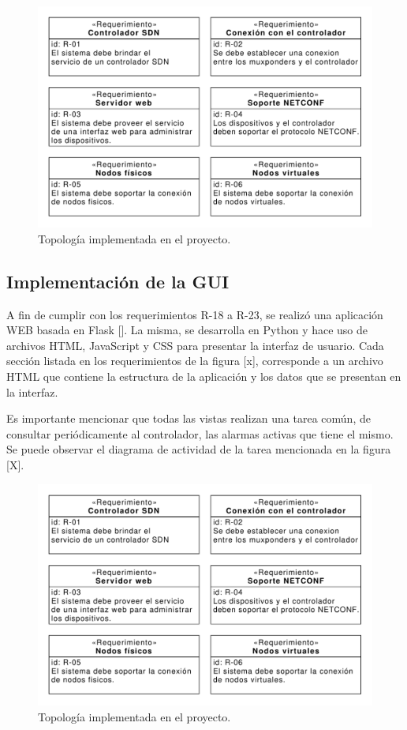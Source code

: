 \begin{figure}[H]
    \centering
    \includegraphics[scale=0.65]{Figures/req_sys.pdf}
    \caption{Topología implementada en el proyecto.}
    \label{fig:req_sys}
  \end{figure}


  \subsection{Implementación de la GUI}
  A fin de cumplir con los requerimientos R-18 a R-23, se realizó una aplicación WEB basada en Flask []. La misma, se desarrolla en Python y hace uso de archivos HTML, JavaScript y CSS para presentar la interfaz de usuario. Cada sección listada en los requerimientos de la figura [x], corresponde a un archivo HTML que contiene la estructura de la aplicación y los datos que se presentan en la interfaz. 

Es importante mencionar que todas las vistas realizan una tarea común, de consultar periódicamente al controlador, las alarmas activas que tiene el mismo. Se puede observar el diagrama de actividad de la tarea mencionada en la figura [X].

\begin{figure}[H]
    \centering
    \includegraphics[scale=0.65]{Figures/req_sys.pdf}
    \caption{Topología implementada en el proyecto.}
    \label{fig:req_sys}
  \end{figure}

